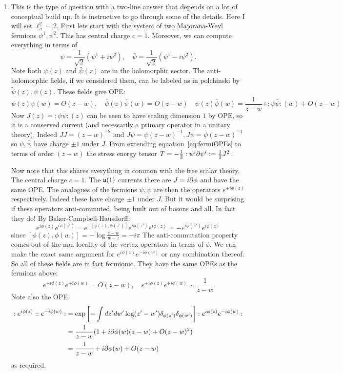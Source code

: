 \documentclass[11pt]{article}
\begin{document}
\begin{enumerate}
	\item This is the type of question with a two-line answer that depends on a lot of conceptual build up. It is instructive to go through some of the details. Here I will set $\ell_s^2 = 2$. First lets start with the system of two Majorana-Weyl fermions $\psi^1, \psi^2$. This has central charge $c=1$. Moreover, we can compute everything in terms of
	\[
		\psi = \frac{1}{\sqrt 2} (\psi^1 + i \psi^2), \quad \bar \psi = \frac{1}{\sqrt 2} (\psi^1 - i \psi^2).
	\]
	Note both $\psi(z)$ and $\bar \psi(z)$ are in the holomorphic sector. The anti-holomorphic fields, if we considered them, can be labeled as in polchinski by $\tilde \psi(\bar z), \tilde{\bar \psi}(\bar z)$. These fields give OPE:
	\begin{equation}\label{eq:fermiOPEs}
		\psi(z) \psi(w) = O(z-w), \quad \bar \psi(z) \bar \psi(w) = O(z-w)  \quad \psi(z) \bar \psi(w) = \frac{1}{z-w} + :\psi \bar \psi:\!(w) + O(z-w)
	\end{equation}
	Now $J(z) = :\psi \bar \psi:\!(z)$ can be seen to have scaling dimension $1$ by OPE, so it is a conserved current (and necessarily a primary operator in a unitary theory). Indeed $J J = (z-w)^{-2}$ and $J\psi = \psi (z-w)^{-1}, J \bar \psi = \bar \psi (z-w)^{-1}$ so $\psi, \bar \psi$ have charge $\pm 1$ under $J$. From extending equation~\eqref{eq:fermiOPEs} to terms of order $(z-w)$ the stress energy tensor $T = - \frac12 :\psi^i \partial \psi^i: = \frac12 J^2$.
	
	Now note that this shares everything in common with the free scalar theory. The central charge $c=1$. The $\frak u(1)$ currents there are $J = i \partial \phi$ and have the same OPE. The analogues of the fermions $\psi, \bar \psi$ are then the operators $e^{\pm i \phi(z)}$ respectively. Indeed these have charge $\pm 1$ under $J$. But it would be surprising if these operators anti-commuted, being built out of bosons and all. In fact they do! By Baker-Campbell-Hausdorff:
	\[
		e^{i \phi(z)} e^{i \phi(z')} = e^{- [\phi(z), \phi(z')]} e^{i \phi(z')} e^{i\phi(z)} = -e^{i \phi(z')} e^{i\phi(z)}
	\]
	since $[\phi(z), \phi(w)] = - \log \frac{z-w}{w-z} = - i \pi$
	The anti-commutation property comes out of the non-locality of the vertex operators in terms of $\phi$. We can make the exact same argument for $e^{i \phi(z)} e^{-i\phi(w)}$ or any combination thereof. So all of these fields are in fact fermionic. They have the same OPEs as the fermions above:
	\[
		e^{\pm i \phi(z)} e^{\pm i \phi(w)} = O(z-w), \quad e^{\pm i \phi(z)} e^{\mp i \phi(w)} \sim \frac{1}{z-w}
	\]
	Note also the OPE 
	\[
	\begin{aligned}
		:e^{i \phi(z)}: :e^{-i \phi(w)}: &= \exp\left[- \int dz' dw' \log(z' - w') \delta_{\phi(z')} \delta_{\phi(w')} \right] :e^{i \phi(z)} e^{-i \phi(w)}:\\
		 &= \frac{1}{z-w} (1 + i \partial \phi(w) (z-w) + O(z-w)^2)\\
		 &= \frac{1}{z-w} + i \partial \phi(w) + O(z-w)
	\end{aligned}
	\]
	as required. 
	

\end{enumerate}
\end{document}
